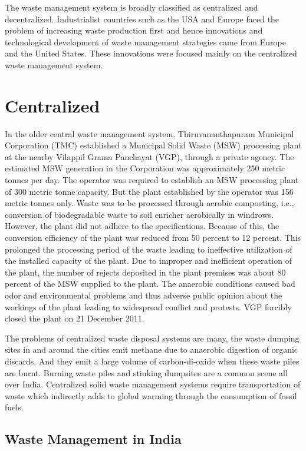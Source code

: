 \documentclass[12pt,a4paper]{report}
\begin{document}
The waste management system is broadly classified as centralized and decentralized. Industrialist countries such as the USA and Europe faced the problem of increasing waste production first and hence innovations and technological development of waste management strategies came from Europe and the United States. These innovations were focused mainly on the centralized waste management system.

\section{Centralized}
\label{cent}
In the older central waste management system, Thiruvananthapuram Municipal Corporation (TMC) established a Municipal Solid Waste (MSW) processing plant at the nearby Vilappil Grama Panchayat (VGP), through a private agency. The estimated MSW generation in the Corporation was approximately 250 metric tonnes per day. The operator was required to establish an MSW processing plant of 300 metric tonne capacity. But the plant established by the operator was 156 metric tonnes only. Waste was to be processed through aerobic composting, i.e., conversion of biodegradable waste to soil enricher aerobically in windrows. However, the plant did not adhere to the specifications. Because of this, the conversion efficiency of the plant was reduced from 50 percent to 12 percent. This prolonged the processing period of the waste leading to ineffective utilization of the installed capacity of the plant. Due to improper and inefficient operation of the plant, the number of rejects deposited in the plant premises was about 80 percent of the MSW supplied to the plant. The anaerobic conditions caused bad odor and environmental problems and thus adverse public opinion about the workings of the plant leading to widespread conflict and protests. VGP forcibly closed the plant on 21 December 2011.

The problems of centralized waste disposal systems are many, the waste dumping sites in and around the cities emit methane due to anaerobic digestion of organic discards. And they emit a large volume of carbon-di-oxide when these waste piles are burnt. Burning waste piles and stinking dumpsites are a common scene all over India. Centralized solid waste management systems require transportation of waste which indirectly adds to global warming through the consumption of fossil fuels.

\subsection{Waste Management in India}
\end{document}
